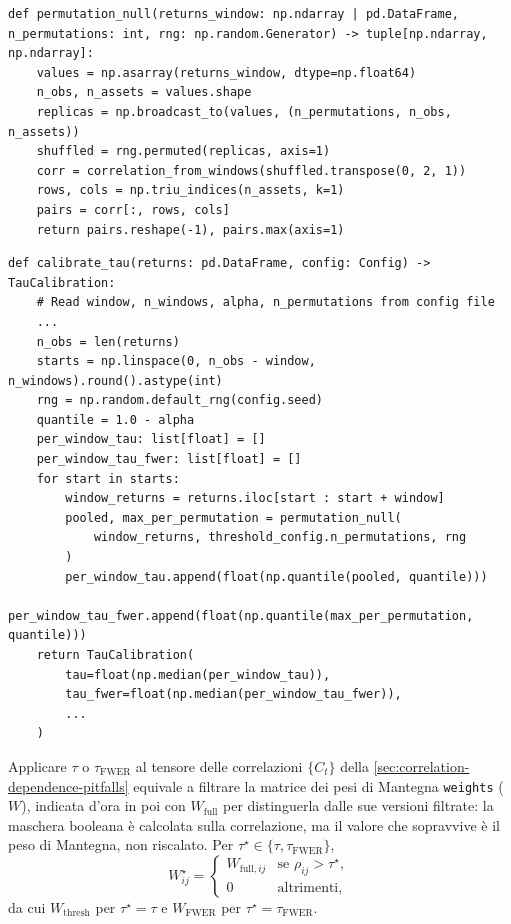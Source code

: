 \begin{listing}[H]
\begin{verbatim}
def permutation_null(returns_window: np.ndarray | pd.DataFrame, n_permutations: int, rng: np.random.Generator) -> tuple[np.ndarray, np.ndarray]:
    values = np.asarray(returns_window, dtype=np.float64)
    n_obs, n_assets = values.shape
    replicas = np.broadcast_to(values, (n_permutations, n_obs, n_assets))
    shuffled = rng.permuted(replicas, axis=1)
    corr = correlation_from_windows(shuffled.transpose(0, 2, 1))
    rows, cols = np.triu_indices(n_assets, k=1)
    pairs = corr[:, rows, cols]
    return pairs.reshape(-1), pairs.max(axis=1)
\end{verbatim}
\caption{\texttt{permutation\_null}}
\label{lst:permutation-null}
\end{listing}

\begin{listing}[H]
\begin{verbatim}
def calibrate_tau(returns: pd.DataFrame, config: Config) -> TauCalibration:
    # Read window, n_windows, alpha, n_permutations from config file
    ...
    n_obs = len(returns)
    starts = np.linspace(0, n_obs - window, n_windows).round().astype(int)
    rng = np.random.default_rng(config.seed)
    quantile = 1.0 - alpha
    per_window_tau: list[float] = []
    per_window_tau_fwer: list[float] = []
    for start in starts:
        window_returns = returns.iloc[start : start + window]
        pooled, max_per_permutation = permutation_null(
            window_returns, threshold_config.n_permutations, rng
        )
        per_window_tau.append(float(np.quantile(pooled, quantile)))
        per_window_tau_fwer.append(float(np.quantile(max_per_permutation, quantile)))
    return TauCalibration(
        tau=float(np.median(per_window_tau)),
        tau_fwer=float(np.median(per_window_tau_fwer)),
        ...
    )
\end{verbatim}
\caption{\texttt{calibrate\_tau}}
\label{lst:calibrate-tau}
\end{listing}

Applicare $\tau$ o $\tau_{\mathrm{FWER}}$ al tensore delle correlazioni $\{C_t\}$ della \cref{sec:correlation-dependence-pitfalls} equivale a filtrare la matrice dei pesi di Mantegna \texttt{weights} ($W$), indicata d'ora in poi con $W_{\mathrm{full}}$ per distinguerla dalle sue versioni filtrate: la maschera booleana è calcolata sulla correlazione, ma il valore che sopravvive è il peso di Mantegna, non riscalato. Per $\tau^\star\in\{\tau,\tau_{\mathrm{FWER}}\}$,
$$W^\star_{ij} = \begin{cases} W_{\mathrm{full},ij} & \text{se } \rho_{ij}>\tau^\star, \\ 0 & \text{altrimenti}, \end{cases}$$
da cui $W_{\mathrm{thresh}}$ per $\tau^\star=\tau$ e $W_{\mathrm{FWER}}$ per $\tau^\star=\tau_{\mathrm{FWER}}$.

